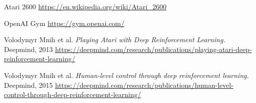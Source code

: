 \documentclass[12pt]{article}
\begin{document}
\begin{thebibliography}{9}

  Atari 2600 \url{https://en.wikipedia.org/wiki/Atari_2600}

  OpenAI Gym \url{https://gym.openai.com/}


  Volodymyr Mnih et al. 
\textit{Playing Atari with Deep Reinforcement Learning.} Deepmind, 2013
   \url{https://deepmind.com/research/publications/playing-atari-deep-reinforcement-learning/}

  Volodymyr Mnih et al. 
\textit{Human-level control through deep reinforcement learning.} Deepmind, 2015
   \url{https://deepmind.com/research/publications/human-level-control-through-deep-reinforcement-learning/}


\end{thebibliography}
\end{document}
